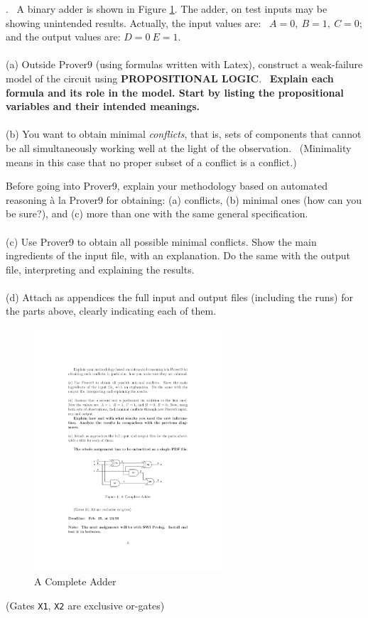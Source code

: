 \documentclass[fullapage,12pt]{article}
\begin{document}
. \ A binary adder is shown in Figure \ref{fig:adderNoNums}. The adder, on test inputs may be showing
unintended  results. Actually, the input values are:
\ $A=0, \ B=1,\ C=0$; and the output values are: $D=0 \ E=1$.\\
\\
(a) Outside Prover9 (using formulas written with Latex), construct a weak-failure model of the circuit using {\bf PROPOSITIONAL LOGIC}.
\ {\bf Explain each formula and its role in the model. Start by listing the propositional variables and their intended meanings.}\\
\\
(b) You want to obtain minimal {\em conflicts}, that is, sets of components that cannot be all simultaneously working
 well  at the light of the observation. \ (Minimality means in this case that no proper
subset of a conflict is a conflict.)

Before going into Prover9, explain your methodology based on automated reasoning \`a la Prover9 for obtaining: (a) conflicts, (b) minimal ones (how can you be sure?), and (c) more than one with the same general specification.
\\
\\
(c) Use Prover9 to obtain all possible minimal conflicts. Show the main ingredients of the input file, with an
explanation. Do the same with the output file, interpreting and explaining the results.\\
\\
(d)  Attach as appendices the full input and output files (including the runs) for the parts above, clearly indicating each of them. \\



\begin{figure}[h]
\begin{center}
\includegraphics[width=7cm]{adderNoNums.pdf}
\caption{A Complete Adder}\label{fig:adderNoNums}
\end{center}
\end{figure}
\vspace{-5mm}(Gates {\tt X1}, {\tt X2} are exclusive or-gates)\\
\end{document}
